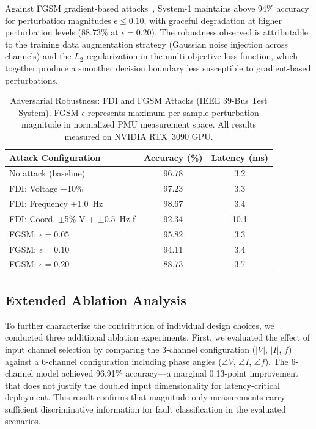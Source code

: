 \documentclass[journal]{IEEEtran}
\begin{document}
Against FGSM gradient-based attacks~\cite{ref_fgsm}, System-1 maintains above 94\% accuracy for perturbation magnitudes $\epsilon \leq 0.10$, with graceful degradation at higher perturbation levels (88.73\% at $\epsilon = 0.20$). The robustness observed is attributable to the training data augmentation strategy (Gaussian noise injection across channels) and the $L_2$ regularization in the multi-objective loss function, which together produce a smoother decision boundary less susceptible to gradient-based perturbations.

\begin{table}[!t]
\centering
\caption{Adversarial Robustness: FDI and FGSM Attacks (IEEE 39-Bus Test System). FGSM $\epsilon$ represents maximum per-sample perturbation magnitude in normalized PMU measurement space. All results measured on NVIDIA RTX~3090 GPU.}
\label{tab:adversarial}
\begin{tabular}{lcc}
\toprule
\textbf{Attack Configuration} & \textbf{Accuracy (\%)} & \textbf{Latency (ms)} \\
\midrule
No attack (baseline)                    & 96.78 & 3.2 \\
FDI: Voltage $\pm$10\%                  & 97.23 & 3.3 \\
FDI: Frequency $\pm$1.0~Hz              & 98.67 & 3.4 \\
FDI: Coord. $\pm$5\% V $+$ $\pm$0.5~Hz f    & 92.34 & 10.1 \\
FGSM: $\epsilon = 0.05$                 & 95.82 & 3.3 \\
FGSM: $\epsilon = 0.10$                 & 94.11 & 3.4 \\
FGSM: $\epsilon = 0.20$                 & 88.73 & 3.7 \\
\bottomrule
\end{tabular}
\end{table}


\subsection{Extended Ablation Analysis}

To further characterize the contribution of individual design choices, we conducted three additional ablation experiments. First, we evaluated the effect of input channel selection by comparing the 3-channel configuration ($|V|$, $|I|$, $f$) against a 6-channel configuration including phase angles ($\angle V$, $\angle I$, $\angle f$). The 6-channel model achieved 96.91\% accuracy---a marginal 0.13-point improvement that does not justify the doubled input dimensionality for latency-critical deployment. This result confirms that magnitude-only measurements carry sufficient discriminative information for fault classification in the evaluated scenarios.
\end{document}
